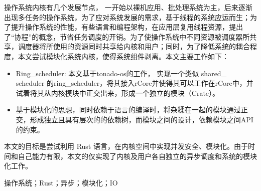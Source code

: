 \setlength{\headheight}{1.5cm}

\abstractcn


\begin{spacing}{1.625}
操作系统内核有几个发展节点， 一开始以裸机应用、批处理系统为主，后来逐渐出现多任务的操作系统，为了应对系统发展的需求，基于线程的系统应运而生；为了提升操作系统的性能，有些语言和编程架构，在应用层复用线程资源，提出了“协程”的概念，节省任务调度的开销。为了使操作系统中不同资源被调度器所共享，调度器将所使用的资源同时共享给内核和用户；同时，为了降低系统的耦合程度，本文尝试模块化系统内核，使得系统组件剥离。本文主要工作如下：
\begin{itemize}
\item Ring\_scheduler: 本文基于tonado-os的工作， 实现一个类似 shared\_ scheduler 的ring\_scheduler，将其接入rCore并使得其可以工作在rCore中，并试着将其从内核模块中正交出来，形成一个独立的模块（Crate）。 

\item 基于模块化的思想，同时依赖于语言的编译时，将杂糅在一起的模块通过正交，形成独立且具有层次的的依赖树，而模块之间的设计，依赖模块之间API的约束。
\end{itemize}
本文的目标是尝试利用 Rust 语言，在内核空间中实现并发安全、模块化。由于时间和自己能力有限，本文的仅实现了内核及用户各自独立的异步调度和系统的模块化工作。

\keywordscn\quad 操作系统；Rust；异步；模块化；IO
\end{spacing}
\let\cleardoublepage\clearpage
\abstracten

